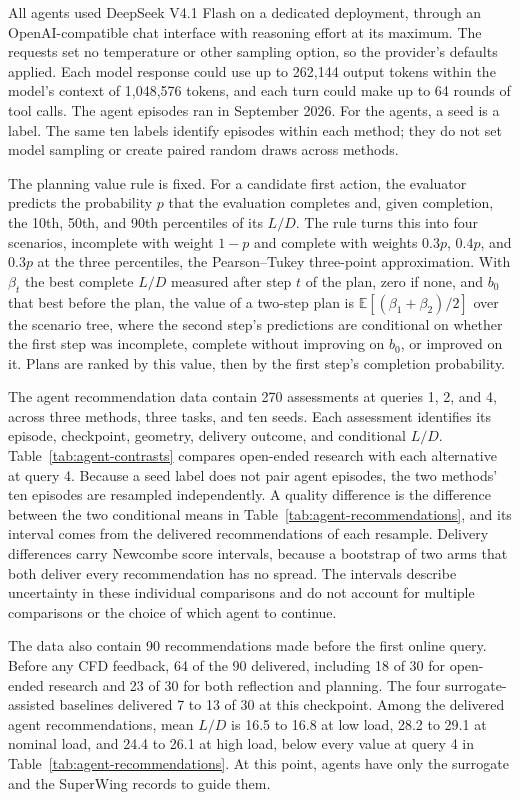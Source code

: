 \documentclass{article} %
\begin{document}
All agents used DeepSeek V4.1 Flash on a dedicated deployment, through an
OpenAI-compatible chat interface with reasoning effort at its maximum. The
requests set no temperature or other sampling option, so the provider's
defaults applied. Each model response could use up to 262{,}144 output tokens
within the model's context of 1{,}048{,}576 tokens, and each turn could make
up to 64 rounds of tool calls. The agent episodes ran in September 2026. For
the agents, a seed is a label. The same ten labels identify episodes within each method;
they do not set model sampling or create paired random draws across methods.

The planning value rule is fixed. For a candidate first action, the evaluator
predicts the probability $p$ that the evaluation completes and, given
completion, the 10th, 50th, and 90th percentiles of its $L/D$. The rule turns
this into four scenarios, incomplete with weight $1 - p$ and complete with
weights $0.3p$, $0.4p$, and $0.3p$ at the three percentiles, the Pearson--Tukey
three-point approximation. With $\beta_t$ the best complete $L/D$
measured after step $t$ of the plan, zero if none, and $b_0$ that best before
the plan, the value of a two-step plan is $\mathbb{E}[(\beta_1 + \beta_2)/2]$
over the scenario tree, where the second step's predictions are conditional on
whether the first step was incomplete, complete without improving on $b_0$, or
improved on it. Plans are ranked by this value, then by the first step's
completion probability.

The agent recommendation data contain 270 assessments at queries 1, 2, and 4,
across three methods, three tasks, and ten seeds. Each assessment identifies its
episode, checkpoint, geometry, delivery outcome, and conditional $L/D$.
Table~\ref{tab:agent-contrasts} compares open-ended research with each alternative
at query 4. Because a seed label does not pair agent episodes, the two methods'
ten episodes are resampled independently. A quality difference is the difference
between the two conditional means in Table~\ref{tab:agent-recommendations}, and
its interval comes from the delivered recommendations of each resample. Delivery
differences carry Newcombe score intervals, because a bootstrap of two arms that
both deliver every recommendation has no spread. The intervals describe uncertainty in these individual comparisons
and do not account for multiple comparisons or the choice of which agent to
continue.

The data also contain 90 recommendations made before the first online query.
Before any CFD feedback, 64 of the 90 delivered, including 18 of 30 for
open-ended research and 23 of 30 for both reflection and planning. The four
surrogate-assisted baselines delivered 7 to 13 of 30 at this checkpoint. Among
the delivered agent recommendations, mean $L/D$ is 16.5 to 16.8 at low load,
28.2 to 29.1 at nominal load, and 24.4 to 26.1 at high load, below every value
at query 4 in Table~\ref{tab:agent-recommendations}. At this point, agents
have only the surrogate and the SuperWing records to guide them.
\end{document}
